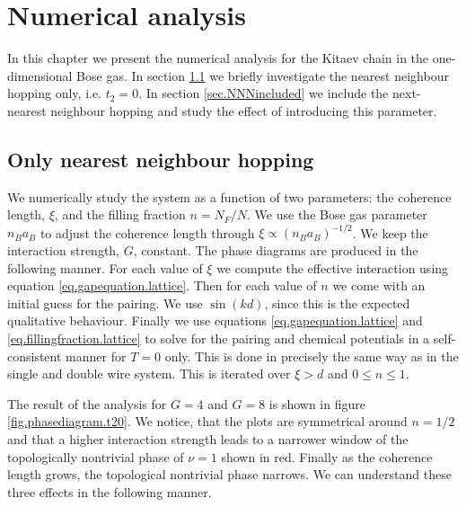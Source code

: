 
\chapter{Numerical analysis} %

\label{Chapter13} %

In this chapter we present the numerical analysis for the Kitaev chain in the one-dimensional Bose gas. In section \ref{sec.onlyNN} we briefly investigate the nearest neighbour hopping only, i.e. $t_2 = 0$. In section \ref{sec.NNNincluded} we include the next-nearest neighbour hopping and study the effect of introducing this parameter. 
 
\section{Only nearest neighbour hopping} \label{sec.onlyNN}
We numerically study the system as a function of two parameters: the coherence length, $\xi$, and the filling fraction $n = N_F/N$. We use the Bose gas parameter $n_Ba_B$ to adjust the coherence length through $\xi \propto (n_Ba_B)^{-1/2}$. We keep the interaction strength, $G$, constant. The phase diagrams are produced in the following manner. For each value of $\xi$ we compute the effective interaction using equation \eqref{eq.gapequation.lattice}. Then for each value of $n$ we come with an initial guess for the pairing. We use $\sin(kd)$, since this is the expected qualitative behaviour. Finally we use equations \eqref{eq.gapequation.lattice} and \eqref{eq.fillingfraction.lattice} to solve for the pairing and chemical potentials in a self-consistent manner for $T = 0$ only. This is done in precisely the same way as in the single and double wire system. This is iterated over $\xi > d$ and $0\leq n \leq 1$. 

The result of the analysis for $G = 4$ and $G = 8$ is shown in figure \ref{fig.phasediagram.t20}. We notice, that the plots are symmetrical around $n = 1/2$ and that a higher interaction strength leads to a narrower window of the topologically nontrivial phase of $\nu = 1$ shown in red. Finally as the coherence length grows, the topological nontrivial phase narrows. We can understand these three effects in the following manner. 

